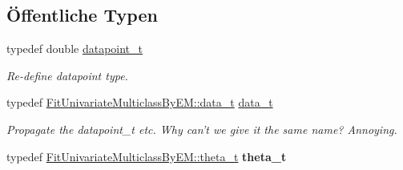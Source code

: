 \subsection*{Öffentliche Typen}
\begin{DoxyCompactItemize}
\item 
\hypertarget{classCDA_1_1GaussianMixtureModel1D_a72f70fc9a6a659f61bcaf74597d82aa7}{
typedef double \hyperlink{classCDA_1_1GaussianMixtureModel1D_a72f70fc9a6a659f61bcaf74597d82aa7}{datapoint\_\-t}}
\label{classCDA_1_1GaussianMixtureModel1D_a72f70fc9a6a659f61bcaf74597d82aa7}

\begin{DoxyCompactList}\small\item\em Re-\/define datapoint type. \item\end{DoxyCompactList}\item 
\hypertarget{classCDA_1_1GaussianMixtureModel1D_ab2cb96bfc349fa1653b60c081192335f}{
typedef \hyperlink{classCDA_1_1EMData}{FitUnivariateMulticlassByEM::data\_\-t} \hyperlink{classCDA_1_1GaussianMixtureModel1D_ab2cb96bfc349fa1653b60c081192335f}{data\_\-t}}
\label{classCDA_1_1GaussianMixtureModel1D_ab2cb96bfc349fa1653b60c081192335f}

\begin{DoxyCompactList}\small\item\em Propagate the datapoint\_\-t etc. Why can't we give it the same name? Annoying. \item\end{DoxyCompactList}\item 
\hypertarget{classCDA_1_1GaussianMixtureModel1D_a897d8d067cd36c1392814b47b43dfa0d}{
typedef \hyperlink{classCDA_1_1EMThetas}{FitUnivariateMulticlassByEM::theta\_\-t} {\bfseries theta\_\-t}}
\label{classCDA_1_1GaussianMixtureModel1D_a897d8d067cd36c1392814b47b43dfa0d}

\end{DoxyCompactItemize}
